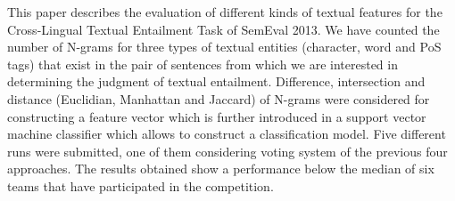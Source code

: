This paper describes the evaluation of different kinds of textual features for the Cross-Lingual Textual Entailment Task of SemEval 2013. We have counted the
 number of N-grams for three types of textual entities (character, word and PoS
 tags) that exist in the pair of sentences from which we are interested in
 determining the judgment of textual entailment. Difference, intersection and
 distance (Euclidian, Manhattan and Jaccard) of N-grams were considered for
 constructing a feature vector which is further introduced in a support vector
 machine classifier which allows to construct a classification model. Five
 different runs were submitted, one of them considering              voting system of
 the
 previous four approaches. The results obtained show a performance below the
 median of six teams that have participated in the competition.

